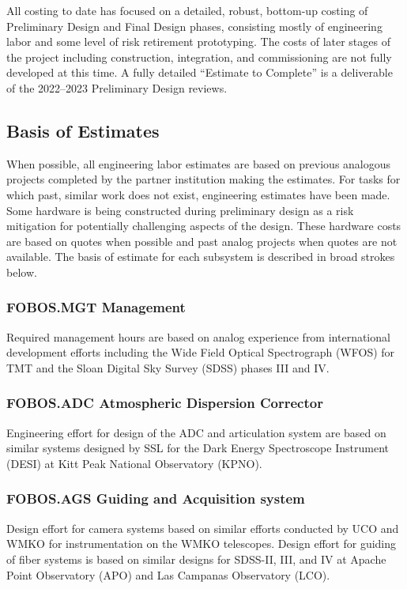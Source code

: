 \documentclass[oneside,11pt]{amsart}
\begin{document}
All costing to date has focused on a detailed, robust, bottom-up
costing of Preliminary Design and Final Design phases, consisting
mostly of engineering labor and some level of risk retirement
prototyping. The costs of later stages of the project including
construction, integration, and commissioning are not fully developed
at this time. A fully detailed ``Estimate to Complete''  is a deliverable of the 2022--2023 Preliminary Design reviews.

\subsection{Basis of Estimates}

When possible, all engineering labor estimates are based on previous
analogous projects completed by the partner institution making the
estimates. For tasks for which past, similar work does not exist,
engineering estimates have been made. Some hardware is being
constructed during preliminary design as a risk mitigation for
potentially challenging aspects of the design. These hardware costs
are based on quotes when possible and past analog projects when
quotes are not available. The basis of estimate for each subsystem
is described in broad strokes below.

\subsubsection{FOBOS.MGT Management}

Required management hours are based on analog experience from
international development efforts including the Wide Field Optical
Spectrograph (WFOS) for TMT and the Sloan Digital Sky Survey (SDSS)
phases III and IV.

\subsubsection{FOBOS.ADC Atmospheric Dispersion Corrector}

Engineering effort for design of the ADC and articulation system are
based on similar systems designed by SSL for the Dark Energy
Spectroscope Instrument (DESI) at Kitt Peak National Observatory
(KPNO).

\subsubsection{FOBOS.AGS Guiding and Acquisition system}

Design effort for camera systems based on similar efforts conducted
by UCO and WMKO for instrumentation on the WMKO telescopes. Design
effort for guiding of fiber systems is based on similar designs for
SDSS-II, III, and IV at Apache Point Observatory (APO) and Las
Campanas Observatory (LCO).
\end{document}
